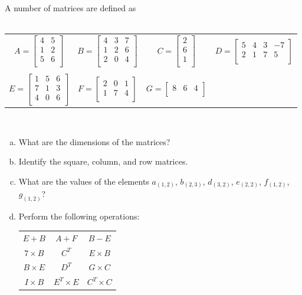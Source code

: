 \documentclass{article}
\begin{document}
\begin{problem}
A number of matrices are defined as\\\\
\begin{tabular}{c c c c}
$A = \begin{bmatrix}
4 & 5 \\
1 & 2 \\
5 & 6 \\
\end{bmatrix}$
&
$B = \begin{bmatrix}
4 & 3 & 7 \\
1 & 2 & 6 \\
2 & 0 & 4 \\
\end{bmatrix}$
&
$C = \begin{bmatrix}
2 \\
6 \\
1 \\
\end{bmatrix}$ 
&
$D = \begin{bmatrix}
5 & 4 & 3 & -7 \\
2 & 1 & 7 & 5 \\
\end{bmatrix}$ 
\\\\
$E = \begin{bmatrix}
1 & 5 & 6 \\
7 & 1 & 3 \\
4 & 0 & 6 \\
\end{bmatrix}$
&
$F = \begin{bmatrix}
2 & 0 & 1 \\
1 & 7 & 4 \\
\end{bmatrix}$
&
$G = \begin{bmatrix}
8 & 6 & 4 \\
\end{bmatrix}$ 
& \\
\end{tabular}\\
\begin{enumerate}[(a)]
\item What are the dimensions of the matrices?
\item Identify the square, column, and row matrices.
\item What are the values of the elements $a_{(1,2)}$, $b_{(2,3)}$, $d_{(3,2)}$, $e_{(2,2)}$, $f_{(1,2)}$, $g_{(1,2)}$?
\item Perform the following operations:\\
\begin{tabular}{ c c c }
$E + B$			&	$A + F$				&	$B - E$\\
$7 \times B$	&	$C^{T}$				&	$E \times B$\\
$B \times E$	&	$D^{T}$				&	$G \times C$\\
$I \times B$	&	$E^{T} \times E$	&	$C^{T} \times C$\\
\end{tabular}

\end{enumerate}
\end{problem}
\end{document}
